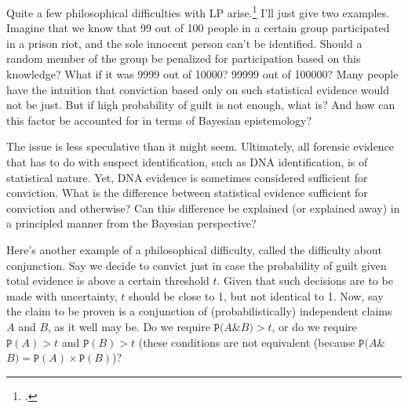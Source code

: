\documentclass[11pt, a4paper]{article}
\begin{document}
Quite a few philosophical difficulties with  LP arise.\footcite{Cohen1977The-probable-an} 
 I'll just give two examples.  Imagine that we know that  99 out of 100 people in a certain group participated in   a prison riot, and the sole innocent person can't be identified. Should a random member of the group be penalized for participation based on this knowledge? What if it was 9999 out of 10000? 99999 out of 100000? Many people have the intuition that conviction based only on such statistical evidence would not be just. But if high probability of guilt is not enough, what is? And how can this factor be accounted for in terms of Bayesian epistemology? 

The issue is less speculative than it might seem. Ultimately, all  forensic evidence that has to do with suspect identification, such as DNA identification, is  of statistical nature. Yet, DNA evidence is sometimes considered sufficient for conviction. What is the difference between   statistical evidence sufficient for conviction and otherwise? Can this difference be explained (or explained away) in a principled manner from the Bayesian perspective?


Here's another example of a philosophical difficulty, called the difficulty about conjunction. Say we decide to convict just in case the probability of guilt given total evidence is above a certain threshold $t$. Given that such decisions are to be made with uncertainty, $t$ should be close to 1, but not identical to 1. Now, say the claim to be proven is a conjunction of (probabilistically) independent claims $A$ and $B$, as it well may be. Do we require $\mathtt{P}(A $\&$ B)>t$, or do we require $\mathtt{P}(A)>t$ and $\mathtt{P}(B)>t$ (these conditions are not equivalent (because $\mathtt{P}(A $\&$ B)=\mathtt{P}(A)\times \mathtt{P}(B)$)? 




\end{document}
